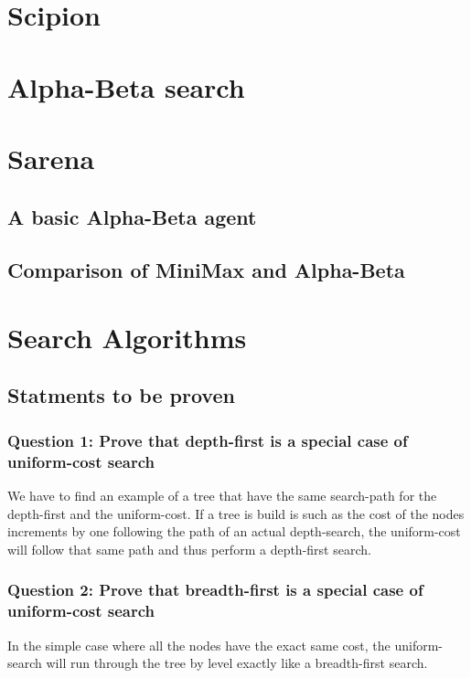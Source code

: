 \documentclass[a4paper,10pt]{article}
\begin{document}
	\newpage
	

	\section{Scipion}
	
	\section{Alpha-Beta search}	
	
	\section{Sarena}
		\subsection{A basic Alpha-Beta agent}
		
		\subsection{Comparison of MiniMax and Alpha-Beta}
	
	\section{Search Algorithms}
		\subsection{Statments to be proven}
			\subsubsection{Question 1: Prove that depth-first is a special case of uniform-cost search}
				We have to find an example of a tree that have the same search-path for the depth-first and the uniform-cost. If a tree is build is such as the cost of the nodes increments by one following the path of an actual depth-search, the uniform-cost will follow that same path and thus perform a depth-first search. 
				
			\subsubsection{Question 2: Prove that breadth-first is a special case of uniform-cost search}	
				In the simple case where all the nodes have the exact same cost, the uniform-search will run through the tree by level exactly like a breadth-first search.
\end{document}
